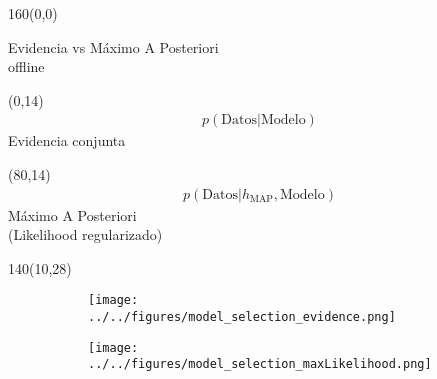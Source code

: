 \documentclass[shownotes,aspectratio=169]{beamer}
\begin{document}
\begin{frame}[plain]
 
\end{frame}


\begin{frame}[plain]
\begin{textblock}{160}(0,0)
\begin{center}
 \large Evidencia vs M\'aximo A Posteriori \\
 \normalsize offline
\end{center}
\end{textblock}



\begin{textblock}{80}(0,14)
 \centering \footnotesize
 \begin{align*}
 p(\text{Datos}|\text{Modelo})
\end{align*}
Evidencia conjunta
\end{textblock}

\begin{textblock}{80}(80,14)
 \centering \footnotesize
\begin{align*}
   p(\text{Datos}| h_{\text{MAP}}, \text{Modelo}) 
\end{align*}
 M\'aximo A Posteriori \\ \scriptsize
 (Likelihood regularizado)
\end{textblock}


\begin{textblock}{140}(10,28)
     \centering 
       \begin{figure}[H]     
     \centering 
     \begin{subfigure}[b]{0.47\textwidth}
       \texttt{[image: ../../figures/model\_selection\_evidence.png]}
     \end{subfigure}
     \begin{subfigure}[b]{0.49\textwidth}
       \texttt{[image: ../../figures/model\_selection\_maxLikelihood.png]}
     \end{subfigure}
\end{figure}
\end{textblock}


\end{frame}
\end{document}
